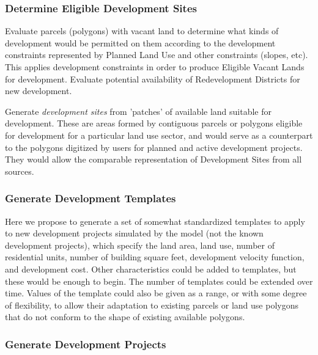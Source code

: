 \subsubsection{Determine Eligible Development Sites}

Evaluate parcels (polygons) with vacant land to determine what kinds of development would be 
permitted on them
according to the development constraints represented by Planned Land Use and other constraints
(slopes, etc).  This applies development constraints in order to produce Eligible Vacant Lands for
development. Evaluate potential availability of Redevelopment Districts for new development.

Generate \emph{development sites} from 'patches' of available land suitable for development.  
These are
areas formed by contiguous parcels or polygons eligible for development for a particular land use
sector, and would serve as a counterpart to the polygons digitized by users for planned and active 
development projects.  They would allow the comparable representation of Development Sites from all
sources.

\subsubsection{Generate Development Templates}
Here we propose to generate a set of somewhat standardized templates to apply to new development
projects simulated by the model (not the known development projects), which specify the land area,
land use, number of residential units, number of building square feet, development velocity function,
and development cost.  Other characteristics could be added to templates, but these would be enough 
to begin.  The number of templates could be extended over time.  Values of the template could also
be given as a range, or with some degree of flexibility, to allow their adaptation to existing parcels 
or land use polygons that do not conform to the shape of existing available polygons.

\subsubsection{Generate Development Projects}

